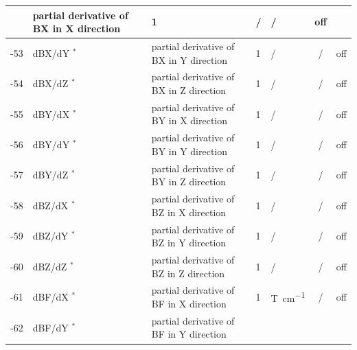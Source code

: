 \begin{landscape}
\begin{longtable}{|r|l|l|l|l|c|c|}
                           & partial derivative of BX in X direction
                           & 1                            & /
			   & /              & off
    \\ \hline
    -53                    & dBX/dY $^*$
                           & partial derivative of BX in Y direction
                           & 1                            & /
			   & /              & off
    \\ \hline
    -54                    & dBX/dZ $^*$
                           & partial derivative of BX in Z direction
                           & 1                            & /
			   & /              & off
    \\ \hline
    -55                    & dBY/dX $^*$
                           & partial derivative of BY in X direction
                           & 1                            & /
			   & /              & off
    \\ \hline
    -56                    & dBY/dY $^*$
                           & partial derivative of BY in Y direction
                           & 1                            & /
			   & /              & off
    \\ \hline
    -57                    & dBY/dZ $^*$
                           & partial derivative of BY in Z direction
                           & 1                            & /
			   & /              & off
    \\ \hline
    -58                    & dBZ/dX $^*$
                           & partial derivative of BZ in X direction
                           & 1                            & /
			   & /              & off
    \\ \hline
    -59                    & dBZ/dY $^*$
                           & partial derivative of BZ in Y direction
                           & 1                            & /
			   & /              & off
    \\ \hline
    -60                    & dBZ/dZ $^*$
                           & partial derivative of BZ in Z direction
                           & 1                            & /
			   & /              & off
    \\ \hline
    -61                    & dBF/dX $^*$
                           & partial derivative of BF in X direction
                           & 1                            & \si{\tesla\per\centi\metre}
			   & /              & off
    \\ \hline
    -62                    & dBF/dY $^*$
                           & partial derivative of BF in Y direction

\end{longtable}
\end{landscape}
